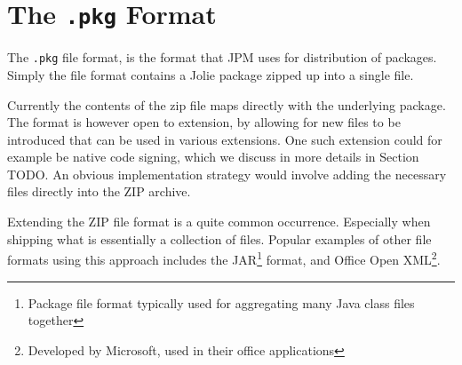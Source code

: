 \section{The {\tt .pkg} Format} \label{sec:pkg}

The \verb!.pkg! file format, is the format that JPM uses for distribution of
packages. Simply the file format contains a Jolie package zipped up into a
single file.

Currently the contents of the zip file maps directly with the underlying
package. The format is however open to extension, by allowing for new files to
be introduced that can be used in various extensions. One such extension could
for example be native code signing, which we discuss in more details in Section
TODO. An obvious implementation strategy would involve adding the necessary
files directly into the ZIP archive.

Extending the ZIP file format is a quite common occurrence. Especially when
shipping what is essentially a collection of files. Popular examples of other
file formats using this approach includes the JAR\footnote{Package file format
typically used for aggregating many Java class files together}\autocite{JAR}
format, and Office Open XML\footnote{Developed by Microsoft, used in their
office applications}\autocite{OOXA}.
